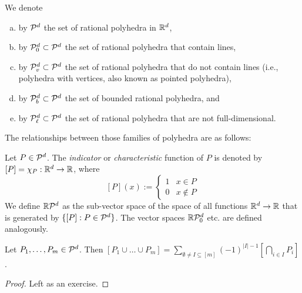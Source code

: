 \begin{definition}
  We denote
  \begin{enumerate}[(a)]
    \item by $\mathcal{P}^d$ the set of rational polyhedra in $\mathbb{R}^d$,
    \item by $\mathcal{P}_0^d \subset \mathcal{P}^d$ the set of rational polyhedra that contain lines,
    \item by $\mathcal{P}_v^d \subset \mathcal{P}^d$ the set of rational polyhedra that do not contain lines
      (i.e., polyhedra with vertices, also known as pointed polyhedra),
    \item by $\mathcal{P}_b^d \subset \mathcal{P}^d$ the set of bounded rational polyhedra, and
    \item by $\mathcal{P}_\ell^d \subset \mathcal{P}^d$ the set of rational polyhedra that are not full-dimensional.
  \end{enumerate}
\end{definition}
The relationships between those families of polyhedra are as follows:
\begin{center}
\end{center}

\begin{definition}
  Let $P \in \mathcal{P}^d$.
  The \emph{indicator} or \emph{characteristic} function of $P$ is denoted by $[P] = \chi_P : \mathbb{R}^d \to \mathbb{R}$,
  where
  \[
    [P](x) := \begin{cases}
                1 & x \in P \\
                0 & x \not\in P
              \end{cases}
  \]
  We define $\mathbb{R} \mathcal{P}^d$ as the sub-vector space of the space of all functions $\mathbb{R}^d \to \mathbb{R}$
  that is generated by $\{ [P] : P \in \mathcal{P}^d \}$.
  The vector spaces $\mathbb{R} \mathcal{P}_0^d$ etc. are defined analogously.
\end{definition}

\begin{lemma}
  \label{lemma:inclusion-exclusion}
  Let $P_1, \ldots, P_m \in \mathcal{P}^d$.
  Then
  $[P_1 \cup \dots \cup P_m] = \sum_{\emptyset \neq I \subseteq [m]} (-1)^{|I| - 1} [\bigcap_{i \in I} P_i]$.
\end{lemma}
\begin{proof}
  Left as an exercise.
\end{proof}

